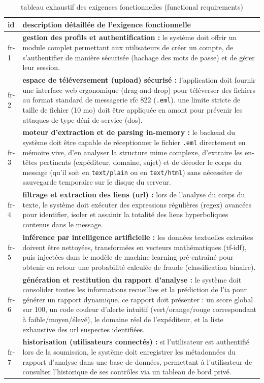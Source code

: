 \documentclass[12pt,a4paper]{report}
\begin{document}
\begin{table}[h]
\centering
\begin{tabular}{|l|p{12cm}|}
\hline
\textbf{id} & \textbf{description détaillée de l'exigence fonctionnelle} \\ \hline
fr-1 & \textbf{gestion des profils et authentification :} le système doit offrir un module complet permettant aux utilisateurs de créer un compte, de s'authentifier de manière sécurisée (hachage des mots de passe) et de gérer leur session. \\ \hline
fr-2 & \textbf{espace de téléversement (upload) sécurisé :} l'application doit fournir une interface web ergonomique (drag-and-drop) pour téléverser des fichiers au format standard de messagerie rfc 822 (\texttt{.eml}). une limite stricte de taille de fichier (10 mo) doit être appliquée en amont pour prévenir les attaques de type déni de service (dos). \\ \hline
fr-3 & \textbf{moteur d'extraction et de parsing in-memory :} le backend du système doit être capable de réceptionner le fichier \texttt{.eml} directement en mémoire vive, d'en analyser la structure mime complexe, d'extraire les en-têtes pertinents (expéditeur, domaine, sujet) et de décoder le corps du message (qu'il soit en \texttt{text/plain} ou en \texttt{text/html}) sans nécessiter de sauvegarde temporaire sur le disque du serveur. \\ \hline
fr-4 & \textbf{filtrage et extraction des liens (url) :} lors de l'analyse du corps du texte, le système doit exécuter des expressions régulières (regex) avancées pour identifier, isoler et assainir la totalité des liens hyperboliques contenus dans le message. \\ \hline
fr-5 & \textbf{inférence par intelligence artificielle :} les données textuelles extraites doivent être nettoyées, transformées en vecteurs mathématiques (tf-idf), puis injectées dans le modèle de machine learning pré-entraîné pour obtenir en retour une probabilité calculée de fraude (classification binaire). \\ \hline
fr-6 & \textbf{génération et restitution du rapport d'analyse :} le système doit consolider toutes les informations recueillies et la prédiction de l'ia pour générer un rapport dynamique. ce rapport doit présenter : un score global sur 100, un code couleur d'alerte intuitif (vert/orange/rouge correspondant à faible/moyen/élevé), le domaine réel de l'expéditeur, et la liste exhaustive des url suspectes identifiées. \\ \hline
fr-7 & \textbf{historisation (utilisateurs connectés) :} si l'utilisateur est authentifié lors de la soumission, le système doit enregistrer les métadonnées du rapport d'analyse dans une base de données, permettant à l'utilisateur de consulter l'historique de ses contrôles via un tableau de bord privé. \\ \hline
\end{tabular}
\caption{tableau exhaustif des exigences fonctionnelles (functional requirements)}
\end{table}
\end{document}
